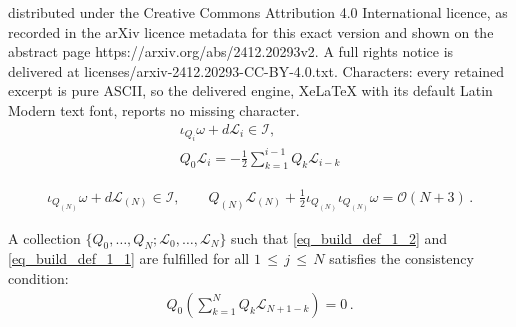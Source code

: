 \documentclass[10pt,a4paper]{amsart}
\def\cI{\mathcal{I}}
\def\cL{\mathcal{L}}
\newcommand{\h}{\cL}
\newcommand{\order}[1]{\mathcal{O}(#1)}
\renewcommand{\leq}{\,{\leqslant}\,}
\begin{document}
distributed under the Creative Commons Attribution 4.0 International licence, as recorded in the arXiv licence metadata for this exact version and shown on the abstract page https://arxiv.org/abs/2412.20293v2. A full rights notice is delivered at licenses/arxiv-2412.20293-CC-BY-4.0.txt. Characters: every retained excerpt is pure ASCII, so the delivered engine, XeLaTeX with its default Latin Modern text font, reports no missing character.
	\begin{gather}\label{eq_build_def_1_2}
		\iota_{Q_i}\omega + d\h_i  \in \mathcal{I},  \\
        \label{eq_build_def_1_1}
		Q_0\h_i = -\frac{1}{2}\sum_{k=1}^{i-1}Q_k \h_{i-k}
	\end{gather}

	\begin{align}
    \label{1st-recursive}
		\iota_{Q_{(N)}}\omega + d\h_{(N)} \in \cI, \qquad Q_{(N)}\h_{(N)} + \frac{1}{2}\iota_{Q_{(N)}}\iota_{Q_{(N)}} \omega = \order{N+3}\,.
	\end{align}

\begin{proposition}\label{prop_consistency}
A collection $\{ Q_0,\dots,Q_{N}; \h_0,\dots,\h_{N} \}$ such that \eqref{eq_build_def_1_2} and  \eqref{eq_build_def_1_1} are fulfilled for all $1\leq j\leq N$ satisfies the consistency condition:
	\begin{align}
		\label{eq_consistency_1}
		Q_0\left( \sum_{k=1}^{N} Q_k \h_{N+1-k} \right) = 0\,.
	\end{align}
    \end{proposition}
\end{document}

